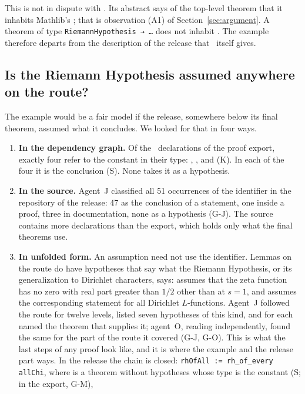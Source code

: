 This is not in dispute with \N. Its abstract says of the top-level theorem that it inhabits Mathlib's ; that is observation (A1) of Section~\ref{sec:argument}.
A theorem of type \texttt{RiemannHypothesis → …} does not inhabit . The example therefore departs from the description of the release that \N\ itself gives.

\subsection{Is the Riemann Hypothesis assumed anywhere on the route?}

The example would be a fair model if the release, somewhere below its final theorem, assumed what it concludes. We looked for that in four ways.

\begin{enumerate}
\item \textbf{In the dependency graph.} Of the \Ndecl\ declarations of the proof export, exactly four refer to the constant  in their type:
, ,  and  (\textsf{K}). In each of the four it is the conclusion (\textsf{S}). None takes it as a hypothesis.
\item \textbf{In the source.} Agent~J classified all 51 occurrences of the identifier in the repository of the release: 47 as the conclusion of a statement, one inside a proof, three in documentation, none as a hypothesis (\textsf{G-J}).
The source contains more declarations than the export, which holds only what the final theorems use.
\item \textbf{In unfolded form.} An assumption need not use the identifier. Lemmas on the route do have hypotheses that say what the Riemann Hypothesis, or its generalization to Dirichlet characters, says:
 assumes that the zeta function has no zero with real part greater than $1/2$ other than at $s = 1$, and  assumes the corresponding statement for all Dirichlet $L$-functions.
Agent~J followed the route for twelve levels, listed seven hypotheses of this kind, and for each named the theorem that supplies it; agent~O, reading independently, found the same for the part of the route it covered (\textsf{G-J}, \textsf{G-O}).
This is what the last steps of any proof look like, and it is where the example and the release part ways.
In the release the chain is closed: \texttt{rhOfAll := rh\_of\_every allChi}, where  is a theorem without hypotheses whose type is the constant  (\textsf{S}; in the export, \textsf{G-M}),

\end{enumerate}
